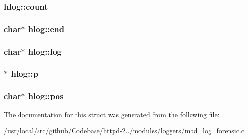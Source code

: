 \subsubsection[{\texorpdfstring{count}{count}}]{ hlog\+::count}\hypertarget{structhlog_a89568d60305cd226a05175e24f6ec220}{}\label{structhlog_a89568d60305cd226a05175e24f6ec220}
\subsubsection[{\texorpdfstring{end}{end}}]{\setlength{\rightskip}{0pt plus 5cm}char$\ast$ hlog\+::end}\hypertarget{structhlog_aaa639f87e7f9b6570b35651765f92ce8}{}\label{structhlog_aaa639f87e7f9b6570b35651765f92ce8}
\subsubsection[{\texorpdfstring{log}{log}}]{\setlength{\rightskip}{0pt plus 5cm}char$\ast$ hlog\+::log}\hypertarget{structhlog_a703bb40ae21b0e8f4b8a82ba56117aac}{}\label{structhlog_a703bb40ae21b0e8f4b8a82ba56117aac}
\subsubsection[{\texorpdfstring{p}{p}}]{$\ast$ hlog\+::p}\hypertarget{structhlog_a7a31231c22aca52f88e81a29e15704d2}{}\label{structhlog_a7a31231c22aca52f88e81a29e15704d2}
\subsubsection[{\texorpdfstring{pos}{pos}}]{\setlength{\rightskip}{0pt plus 5cm}char$\ast$ hlog\+::pos}\hypertarget{structhlog_a1d3b7c879e261fb41cd4181ddc3d18e3}{}\label{structhlog_a1d3b7c879e261fb41cd4181ddc3d18e3}


The documentation for this struct was generated from the following file\+:\begin{DoxyCompactItemize}
\item 
/usr/local/src/github/\+Codebase/httpd-\/2../modules/loggers/\hyperlink{mod__log__forensic_8c}{mod\+\_\+log\+\_\+forensic.\+c}\end{DoxyCompactItemize}
